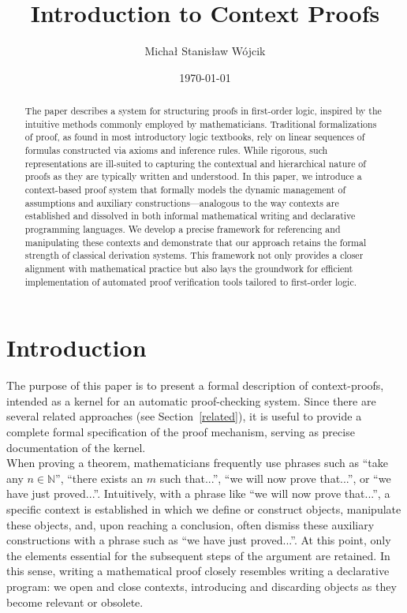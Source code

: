 \documentclass[10pt]{article}
\title{Introduction to Context Proofs}
\author{Michał Stanisław Wójcik}
\date{\today}
\theoremstyle{plain}
\newcommand{\N}{\mathbb{N}}
\begin{document}
\maketitle

\begin{abstract}
The paper describes a system for structuring proofs in first-order logic, inspired by the intuitive methods commonly employed by mathematicians. Traditional formalizations of proof, as found in most introductory logic textbooks, rely on linear sequences of formulas constructed via axioms and inference rules. While rigorous, such representations are ill-suited to capturing the contextual and hierarchical nature of proofs as they are typically written and understood. In this paper, we introduce a context-based proof system that formally models the dynamic management of assumptions and auxiliary constructions—analogous to the way contexts are established and dissolved in both informal mathematical writing and declarative programming languages. We develop a precise framework for referencing and manipulating these contexts and demonstrate that our approach retains the formal strength of classical derivation systems. This framework not only provides a closer alignment with mathematical practice but also lays the groundwork for efficient implementation of automated proof verification tools tailored to first-order logic.
\end{abstract}

\section{Introduction}
The purpose of this paper is to present a formal description of context-proofs, intended as a kernel for an automatic proof-checking system. Since there are several related approaches (see Section~\ref{related}), it is useful to provide a complete formal specification of the proof mechanism, serving as precise documentation of the kernel.
\\

When proving a theorem, mathematicians frequently use phrases such as ``take any $n \in \N$'', ``there exists an $m$ such that...'', ``we will now prove that...'', or ``we have just proved...''. Intuitively, with a phrase like ``we will now prove that...'', a specific context is established in which we define or construct objects, manipulate these objects, and, upon reaching a conclusion, often dismiss these auxiliary constructions with a phrase such as ``we have just proved...''. At this point, only the elements essential for the subsequent steps of the argument are retained. In this sense, writing a mathematical proof closely resembles writing a declarative program: we open and close contexts, introducing and discarding objects as they become relevant or obsolete.
\\
\end{document}
